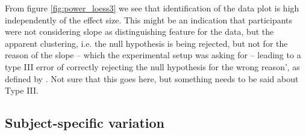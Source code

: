 \documentclass{article}
\newcommand{\green}[1]{{\color{green} #1}} %
\newcommand{\hh}[1]{{\color{orange} #1}} %
\begin{document}



\hh{From figure \ref{fig:power_loess3} we see that identification of the data plot is high independently of the effect size. This might be an indication that participants were not considering slope as distinguishing feature for the data, but the apparent clustering, i.e. the null hypothesis is being rejected, but not for the reason of the slope -- which the experimental setup was asking for --  leading to a type III error of correctly rejecting the null hypothesis for the wrong reason', as defined by \citet{mosteller:48}.} \green{Not sure that this goes here, but something needs to be said about Type III.}

\subsection{Subject-specific variation}
\end{document}
